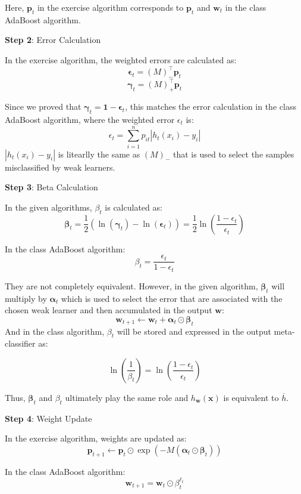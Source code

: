 \documentclass[10pt]{article}
\newcommand{\pv}{\mathbf{p}}
\newcommand{\wv}{\mathbf{w}}
\newcommand{\xv}{\mathbf{x}}
\newcommand{\alphav}{\boldsymbol{\alpha}}
\newcommand{\betav}{\boldsymbol{\beta}}
\newcommand{\epsilonv}{\boldsymbol{\epsilon}}
\newcommand{\gammav}{\boldsymbol{\gamma}}
\newcommand{\one}{\mathbf{1}}
\begin{document}
\begin{exercise}
\begin{enumerate}
		      Here, $\pv_t$ in the exercise algorithm corresponds to $\mathbf{p}_t$ and $\mathbf{w}_t$ in the class AdaBoost algorithm.

		      \textbf{Step 2}: Error Calculation

		      In the exercise algorithm, the weighted errors are calculated as:
		      $$ \epsilonv_t = (M)_-^\top \pv_t $$
		      $$ \gammav_t = (M)_+^\top \pv_t $$

		      Since we proved that $\gammav_t = \one - \epsilonv_t$, this matches the error calculation in the class AdaBoost algorithm, where the weighted error $\epsilon_t$ is:
		      $$ \epsilon_t = \sum_{i=1}^n p_{it} |h_t(x_i) - y_i| $$
		      $|h_t(x_i) - y_i|$ is litearlly the same as $(M)_-$ that is used to select the samples misclassified by weak learners.

		      \textbf{Step 3}: Beta Calculation

		      In the given algorithms, $\beta_t$ is calculated as:
		      $$ \betav_t = \frac{1}{2} \left( \ln(\gammav_t) - \ln(\epsilonv_t) \right)= \frac{1}{2} \ln \left( \frac{1 - \epsilon_t}{\epsilon_t} \right) $$

		      In the class AdaBoost algorithm:
		      $$ \beta_t = \frac{\epsilon_t}{1 - \epsilon_t} $$

		      They are not completely equivalent. However, in the given algorithm, $\betav_t$ will multiply by $\alphav_t$ which is used to select the error that are associated with the chosen weak learner and then accumulated in the output $\wv$:
		      $$ \wv_{t+1} \gets \wv_t + \alphav_t \odot \betav_t $$
		      And in the class algorithm, $\beta_t$ will be stored and expressed in the output meta-classifier as:

		      $$\ln\left(\frac{1}{\beta_t}\right) = \ln \left( \frac{1 - \epsilon_t}{\epsilon_t} \right)$$

		      Thus, $\betav_t$ and $\beta_t$ ultimately play the same role and $h_\wv(\xv)$ is equivalent to $\overline{h}$.

		      \textbf{Step 4}: Weight Update

		      In the exercise algorithm, weights are updated as:
		      $$ \pv_{t+1} \gets \pv_t \odot \exp(-M (\alphav_t \odot \betav_t)) $$

		      In the class AdaBoost algorithm:
		      $$ \mathbf{w}_{t+1} = \mathbf{w}_t \odot \beta_t^{\ell_t} $$


\end{enumerate}
\end{exercise}
\end{document}

